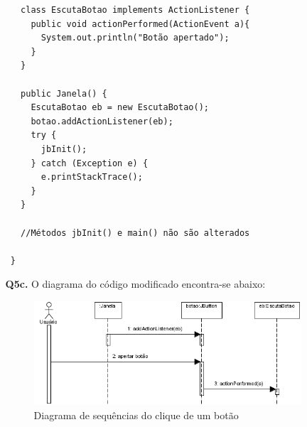 \documentclass[11pt]{article}
\begin{document}
\begin{itemize}
\begin{itemize}
\begin{verbatim}
   class EscutaBotao implements ActionListener {
     public void actionPerformed(ActionEvent a){
       System.out.println("Botão apertado");
     }
   }

   public Janela() {
     EscutaBotao eb = new EscutaBotao();
     botao.addActionListener(eb);
     try {
       jbInit();
     } catch (Exception e) {
       e.printStackTrace();
     }
   }

   //Métodos jbInit() e main() não são alterados

 }
\end{verbatim}
    \item[{\bf Q5c.}] O diagrama do código modificado encontra-se abaixo: 
\begin{figure}[htp]
\begin{center}
  \includegraphics[width=15cm]{recursos/Botao.png}
  \caption[Diagrama de sequências do clique de um botão]
  {Diagrama de sequências do clique de um botão}
  \label{diagrama-botao}
\end{center}
\end{figure}
  \end{itemize}
\end{itemize}

\newpage


\end{document}
